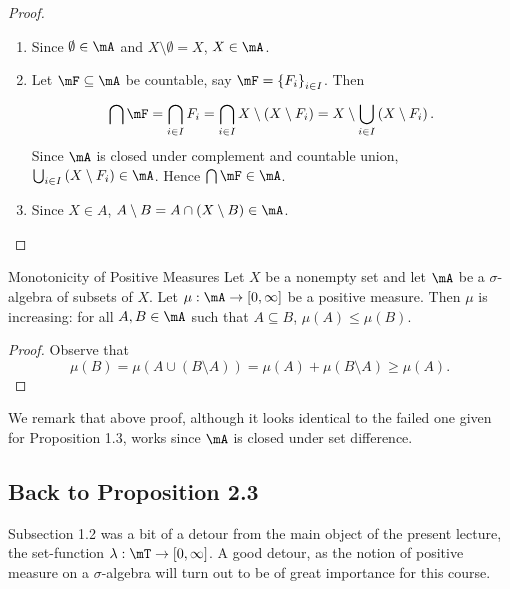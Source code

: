 \documentclass[pmath450]{subfiles}
\begin{document}
    \begin{proof}
        \begin{enumerate}
            \item Since $\emptyset\in\mA$ and $X\setminus\emptyset=X$, $X\in\mA$.
            \item Let $\mF\subseteq\mA$ be countable, say $\mF=\left\lbrace F_i \right\rbrace^{}_{i\in I}$. Then
                \begin{equation*}
                    \bigcap\mF = \bigcap^{}_{i\in I}F_i = \bigcap^{}_{i\in I}X\setminus\left( X\setminus F_i \right) = X\setminus\bigcup^{}_{i\in I}\left( X\setminus F_i \right).
                \end{equation*}
                Since $\mA$ is closed under complement and countable union, $\bigcup^{}_{i\in I}\left( X\setminus F_i \right)\in\mA$. Hence $\bigcap\mF\in\mA$.
            \item Since $X\in A$, $A\setminus B = A\cap \left( X\setminus B \right)\in\mA$.
        \end{enumerate}
    \end{proof}

    \begin{prop}{Monotonicity of Positive Measures}
        Let $X$ be a nonempty set and let $\mA$ be a $\sigma$-algebra of subsets of $X$. Let $\mu:\mA\to\left[ 0,\infty \right]$ be a positive measure. Then $\mu$ is increasing: for all $A,B\in\mA$ such that $A\subseteq B$, $\mu\left( A \right)\leq\mu\left( B \right)$.
    \end{prop}

    \begin{proof}
        Observe that
        \begin{equation*}
            \mu\left( B \right) = \mu\left( A\cup \left( B\setminus A \right) \right) = \mu\left( A \right)+\mu\left( B\setminus A \right)\geq \mu\left( A \right).
        \end{equation*}
    \end{proof}

    \np We remark that above proof, although it looks identical to the failed one given for Proposition 1.3, works since $\mA$ is closed under set difference.

    \subsection{Back to Proposition 2.3}

    Subsection 1.2 was a bit of a detour from the main object of the present lecture, the set-function $\lambda:\mT\to\left[ 0,\infty \right]$. A good detour, as the notion of positive measure on a $\sigma$-algebra will turn out to be of great importance for this course.
\end{document}
